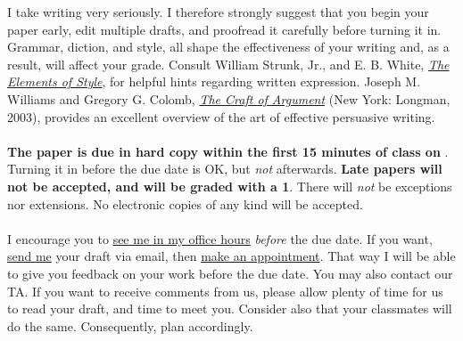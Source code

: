 \documentclass[letterpaper]{article}
\begin{document}
\begin{enumerate}
	I take writing very seriously. I therefore strongly suggest that you begin your paper early, edit multiple drafts, and proofread it carefully before turning it in. Grammar, diction, and style, all shape the effectiveness of your writing and, as a result, will affect your grade. Consult William Strunk, Jr., and E. B. White, \href{http://www.jlakes.org/ch/web/The-elements-of-style.pdf}{\emph{The Elements of Style}}, for helpful hints regarding written expression. Joseph M. Williams and Gregory G. Colomb, \href{http://sir.spbu.ru/en/programs/master/master_program_in_international_relations/digital_library/Book%20Research%20seminar%20by%20Booth.pdf}{\emph{The Craft of Argument}} (New York: Longman, 2003), provides an excellent overview of the art of effective persuasive writing.
	\\ 
	\\
	{\bf The paper is due in hard copy within the first 15 minutes of class on} {\bf {\unskip}}. Turning it in before the due date is OK, but \emph{not} afterwards. {\bf Late papers will not be accepted, and will be graded with a 1}. There will \emph{not} be exceptions nor extensions. No electronic copies of any kind will be accepted.
	\\
	\\
	I encourage you to \href{https://calendly.com/bahamonde/officehours}{see me in my office hours} \emph{before} the due date. If you want, \href{mailto:\filetext}{send me} your draft via email, then \href{https://calendly.com/bahamonde/officehours}{make an appointment}. That way I will be able to give you feedback on your work before the due date. You may also contact our TA. If you want to receive comments from us, please allow plenty of time for us to read your draft, and time to meet you. Consider also that your classmates will do the same. Consequently, plan accordingly.


\end{enumerate}
\end{document}
